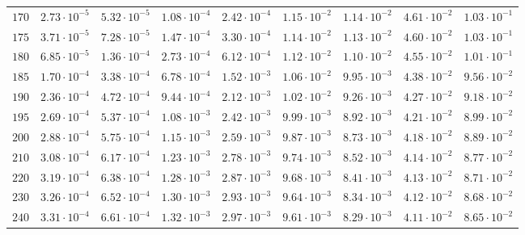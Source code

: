 \begin{landscape}
\begin{table}
\begin{tabular}{lcccccccc}
$	170	$ & $	2.73 \cdot 10^{-5}	$ & $	5.32 \cdot 10^{-5}	$ & $	1.08 \cdot 10^{-4}	$ & $	2.42 \cdot 10^{-4}	$ & $	1.15 \cdot 10^{-2}	$ & $	1.14 \cdot 10^{-2}	$ & $	4.61 \cdot 10^{-2}	$ & $	1.03 \cdot 10^{-1}	 $ \\
$	175	$ & $	3.71 \cdot 10^{-5}	$ & $	7.28 \cdot 10^{-5}	$ & $	1.47 \cdot 10^{-4}	$ & $	3.30 \cdot 10^{-4}	$ & $	1.14 \cdot 10^{-2}	$ & $	1.13 \cdot 10^{-2}	$ & $	4.60 \cdot 10^{-2}	$ & $	1.03 \cdot 10^{-1}	 $ \\
$	180	$ & $	6.85 \cdot 10^{-5}	$ & $	1.36 \cdot 10^{-4}	$ & $	2.73 \cdot 10^{-4}	$ & $	6.12 \cdot 10^{-4}	$ & $	1.12 \cdot 10^{-2}	$ & $	1.10 \cdot 10^{-2}	$ & $	4.55 \cdot 10^{-2}	$ & $	1.01 \cdot 10^{-1}	 $ \\
$	185	$ & $	1.70 \cdot 10^{-4}	$ & $	3.38 \cdot 10^{-4}	$ & $	6.78 \cdot 10^{-4}	$ & $	1.52 \cdot 10^{-3}	$ & $	1.06 \cdot 10^{-2}	$ & $	9.95 \cdot 10^{-3}	$ & $	4.38 \cdot 10^{-2}	$ & $	9.56 \cdot 10^{-2}	 $ \\
$	190	$ & $	2.36 \cdot 10^{-4}	$ & $	4.72 \cdot 10^{-4}	$ & $	9.44 \cdot 10^{-4}	$ & $	2.12 \cdot 10^{-3}	$ & $	1.02 \cdot 10^{-2}	$ & $	9.26 \cdot 10^{-3}	$ & $	4.27 \cdot 10^{-2}	$ & $	9.18 \cdot 10^{-2}	 $ \\
$	195	$ & $	2.69 \cdot 10^{-4}	$ & $	5.37 \cdot 10^{-4}	$ & $	1.08 \cdot 10^{-3}	$ & $	2.42 \cdot 10^{-3}	$ & $	9.99 \cdot 10^{-3}	$ & $	8.92 \cdot 10^{-3}	$ & $	4.21 \cdot 10^{-2}	$ & $	8.99 \cdot 10^{-2}	 $ \\
$	200	$ & $	2.88 \cdot 10^{-4}	$ & $	5.75 \cdot 10^{-4}	$ & $	1.15 \cdot 10^{-3}	$ & $	2.59 \cdot 10^{-3}	$ & $	9.87 \cdot 10^{-3}	$ & $	8.73 \cdot 10^{-3}	$ & $	4.18 \cdot 10^{-2}	$ & $	8.89 \cdot 10^{-2}	 $ \\
$	210	$ & $	3.08 \cdot 10^{-4}	$ & $	6.17 \cdot 10^{-4}	$ & $	1.23 \cdot 10^{-3}	$ & $	2.78 \cdot 10^{-3}	$ & $	9.74 \cdot 10^{-3}	$ & $	8.52 \cdot 10^{-3}	$ & $	4.14 \cdot 10^{-2}	$ & $	8.77 \cdot 10^{-2}	 $ \\
$	220	$ & $	3.19 \cdot 10^{-4}	$ & $	6.38 \cdot 10^{-4}	$ & $	1.28 \cdot 10^{-3}	$ & $	2.87 \cdot 10^{-3}	$ & $	9.68 \cdot 10^{-3}	$ & $	8.41 \cdot 10^{-3}	$ & $	4.13 \cdot 10^{-2}	$ & $	8.71 \cdot 10^{-2}	 $ \\
$	230	$ & $	3.26 \cdot 10^{-4}	$ & $	6.52 \cdot 10^{-4}	$ & $	1.30 \cdot 10^{-3}	$ & $	2.93 \cdot 10^{-3}	$ & $	9.64 \cdot 10^{-3}	$ & $	8.34 \cdot 10^{-3}	$ & $	4.12 \cdot 10^{-2}	$ & $	8.68 \cdot 10^{-2}	 $ \\
$	240	$ & $	3.31 \cdot 10^{-4}	$ & $	6.61 \cdot 10^{-4}	$ & $	1.32 \cdot 10^{-3}	$ & $	2.97 \cdot 10^{-3}	$ & $	9.61 \cdot 10^{-3}	$ & $	8.29 \cdot 10^{-3}	$ & $	4.11 \cdot 10^{-2}	$ & $	8.65 \cdot 10^{-2}	 $ \\

\end{tabular}
\end{table}
\end{landscape}
